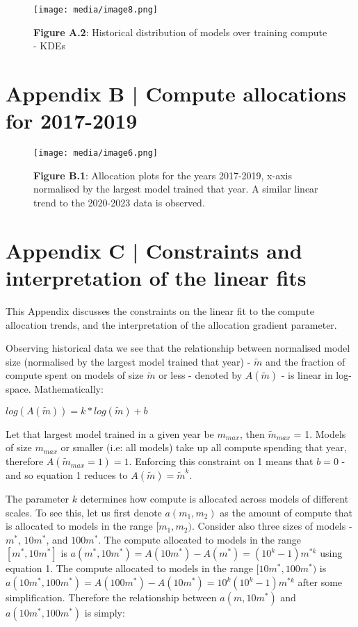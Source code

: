 \documentclass[11pt]{article}
\begin{document}
\begin{figure}[h]
\centering
\texttt{[image: media/image8.png]}
\caption*{\textbf{Figure A.2}: Historical distribution of models over training compute - KDEs}
\end{figure}

\section{Appendix B | Compute allocations for 2017-2019}
\label{appendix-b-compute-allocations-for-2017-2019}

\begin{figure}[h]
\centering
\texttt{[image: media/image6.png]}
\caption*{\textbf{Figure B.1}: Allocation plots for the years 2017-2019, x-axis normalised by the largest model trained that year. A similar linear trend to the 2020-2023 data is observed.}
\end{figure}

\section{Appendix C | Constraints and interpretation of the linear fits}
\label{appendix-c-constraints-and-interpretation-of-the-linear-fits}

This Appendix discusses the constraints on the linear fit to the compute allocation trends, and the interpretation of the allocation gradient parameter.

Observing historical data we see that the relationship between normalised model size (normalised by the largest model trained that year) - $\tilde{m}$ and the fraction of compute spent on models of size $\tilde{m}$ or less - denoted by $A(\tilde{m})$ - is linear in log-space. Mathematically:

$log(A(\tilde{m})) = k * log(\tilde{m}) + b $

Let that largest model trained in a given year be $m_{max}$, then $\tilde{m}_{max}$ = 1. Models of size $m_{max}$ or smaller (i.e: all models) take up all compute spending that year, therefore $A(\tilde{m}_{max} = 1) = 1$. Enforcing this constraint on 1 means that $b = 0$ - and so equation 1 reduces to $A(\tilde{m}) = \tilde{m}^k$.

The parameter $k$ determines how compute is allocated across models of different scales. To see this, let us first denote $a(m_1, m_2)$ as the amount of compute that is allocated to models in the range $[m_1, m_2)$. Consider also three sizes of models - $m^*$, $10m^*$, and $100m^*$. The compute allocated to models in the range $[m^*, 10m^*]$ is $a(m^*, 10m^*) = A(10m^*) - A(m^*) = (10^k - 1)m^{*k}$ using equation 1. The compute allocated to models in the range $[10m^*, 100m^*)$ is $a(10m^*, 100m^*) = A(100m^*) - A(10m^*) = 10^k(10^k - 1)m^{*k}$ after some simplification. Therefore the relationship between $a(m, 10m^*)$ and $a(10m^*, 100m^*)$ is simply:
\end{document}
